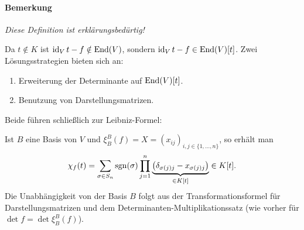 \paragraph{Bemerkung}
	\emph{Diese Definition ist erklärungsbedürtig!}
	
	Da $ t\notin K $ ist $ \operatorname{id}_Vt-f\notin \operatorname{End}(V) $, sondern $ \operatorname{id}_Vt-f\in\operatorname{End}(V)[t] $. Zwei Lösungsstrategien bieten sich an:
		\begin{enumerate}
			\item Erweiterung der Determinante auf $ \operatorname{End}(V)[t] $.
			\item Benutzung von Darstellungsmatrizen.
		\end{enumerate}
	Beide führen schließlich zur Leibniz-Formel:
	
	Ist $ B $ eine Basis von $ V $ und $ \xi_B^B(f) = X = (x_{ij})_{i,j\in\{1,\dots,n\}}$, so erhält man 
		\[ \chi_f(t)=\sum_{\sigma\in S_n}\operatorname{sgn}(\sigma)\prod_{j=1}^{n}\underset{\in K[t]}{\underbrace{\left(\delta_{\sigma(j)j}-x_{\sigma(j)j}\right)}} \in K[t]. \]
	Die Unabhängigkeit von der Basis $ B $ folgt aus der Transformationsformel für Darstellungsmatrizen und dem Determinanten-Multiplikationssatz (wie vorher für $ \det f = \det \xi_B^B(f) $).
